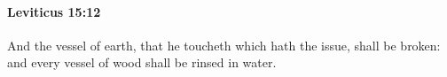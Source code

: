 
		\paragraph{Leviticus 15:12} %
			\label{LEVITICUS-15-12}

			And the vessel of earth, that he toucheth which hath the issue, shall be broken: and every vessel of wood shall be rinsed in water.


